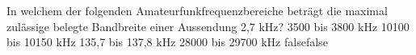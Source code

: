     {In welchem der folgenden Amateurfunkfrequenzbereiche beträgt die maximal zulässige belegte Bandbreite einer Aussendung 2,7 kHz?}
    {3500 bis 3800 kHz}
    {10100 bis 10150 kHz}
    {135,7 bis 137,8 kHz}
    {28000 bis 29700 kHz}
    {false}{false}